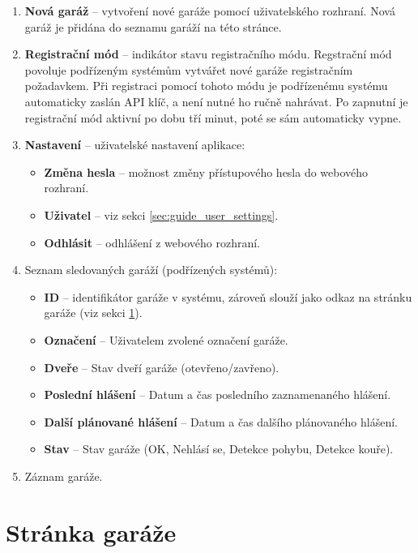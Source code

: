 \begin{enumerate}
    \item \textbf{Nová garáž} -- vytvoření nové garáže pomocí uživatelského rozhraní. Nová garáž je přidána do seznamu garáží na této stránce.
    \item \textbf{Registrační mód} -- indikátor stavu registračního módu. Regstrační mód povoluje podřízeným systémům vytvářet nové garáže registračním požadavkem. Při registraci pomocí tohoto módu je podřízenému systému automaticky zaslán API klíč, a není nutné ho ručně nahrávat. Po zapnutní je registrační mód aktivní po dobu tří minut, poté se sám automaticky vypne.
    \item \textbf{Nastavení} -- uživatelské nastavení aplikace:
    \begin{itemize}
        \item \textbf{Změna hesla} -- možnost změny přístupového hesla do webového rozhraní.
        \item \textbf{Uživatel} -- viz sekci \ref{sec:guide_user_settings}.
        \item \textbf{Odhlásit} -- odhlášení z webového rozhraní.
    \end{itemize}
    \item Seznam sledovaných garáží (podřízených systémů):
    \begin{itemize}
        \item \textbf{ID} -- identifikátor garáže v systému, zároveň slouží jako odkaz na stránku garáže (viz sekci \ref{sec:guide_garage_page}).
        \item \textbf{Označení} -- Uživatelem zvolené označení garáže.
        \item \textbf{Dveře} -- Stav dveří garáže (otevřeno/zavřeno).
        \item \textbf{Poslední hlášení} -- Datum a čas posledního zaznamenaného hlášení.
        \item \textbf{Další plánované hlášení} -- Datum a čas dalšího plánovaného hlášení.
        \item \textbf{Stav} -- Stav garáže (OK, Nehlásí se, Detekce pohybu, Detekce kouře).
    \end{itemize}
    \item Záznam garáže.
\end{enumerate}

\newpage

\section{Stránka garáže}
\label{sec:guide_garage_page}

